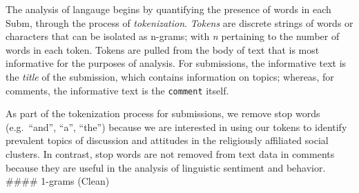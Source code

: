 \documentclass[
]{book}
\newenvironment{Shaded}{\begin{snugshade}}{\end{snugshade}}
\newcommand{\CommentTok}[1]{\textcolor[rgb]{0.56,0.35,0.01}{\textit{#1}}}
\newcommand{\KeywordTok}[1]{\textcolor[rgb]{0.13,0.29,0.53}{\textbf{#1}}}
\newcommand{\NormalTok}[1]{#1}
\newcommand{\OperatorTok}[1]{\textcolor[rgb]{0.81,0.36,0.00}{\textbf{#1}}}
\newcommand{\StringTok}[1]{\textcolor[rgb]{0.31,0.60,0.02}{#1}}
\begin{document}
The analysis of langauge begins by quantifying the presence of words in each Subm, through the process of \emph{tokenization}. \emph{Tokens} are discrete strings of words or characters that can be isolated as n-grams; with \emph{n} pertaining to the number of words in each token. Tokens are pulled from the body of text that is most informative for the purposes of analysis. For submissions, the informative text is the \emph{title} of the submission, which contains information on topics; whereas, for comments, the informative text is the \texttt{comment} itself.

\begin{Shaded}
\end{Shaded}

As part of the tokenization process for submissions, we remove stop words (e.g.~``and'', ``a'', ``the'') because we are interested in using our tokens to identify prevalent topics of discussion and attitudes in the religiously affiliated social clusters. In contrast, stop words are not removed from text data in comments because they are useful in the analysis of linguistic sentiment and behavior.
\#\#\#\# 1-grams (Clean)
\end{document}

